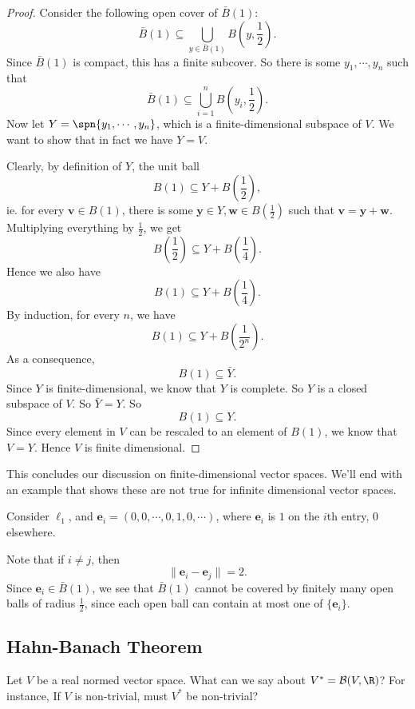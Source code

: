 \documentclass[a4paper]{article}
\begin{document}
\begin{proof}
  Consider the following open cover of $\bar{B}(1)$:
  \[
    \bar{B}(1) \subseteq \bigcup_{y\in \bar{B}(1)} B\left(y, \frac{1}{2}\right).
  \]
  Since $\bar{B}(1)$ is compact, this has a finite subcover. So there is some $y_1, \cdots, y_n$ such that
  \[
    \bar{B}(1) \subseteq \bigcup_{i = 1}^n B\left(y_i, \frac{1}{2}\right).
  \]
  Now let $Y = \spn\{y_1, \cdots, y_n\}$, which is a finite-dimensional subspace of $V$. We want to show that in fact we have $Y = V$.

  Clearly, by definition of $Y$, the unit ball
  \[
    B(1) \subseteq Y + B\left(\frac{1}{2}\right),
  \]
  ie. for every $\mathbf{v}\in B(1)$, there is some $\mathbf{y}\in Y, \mathbf{w} \in B(\frac{1}{2})$ such that $\mathbf{v} = \mathbf{y} + \mathbf{w}$. Multiplying everything by $\frac{1}{2}$, we get
  \[
    B\left(\frac{1}{2}\right) \subseteq Y + B\left(\frac{1}{4}\right).
  \]
  Hence we also have
  \[
    B(1) \subseteq Y + B\left(\frac{1}{4}\right).
  \]
  By induction, for every $n$, we have
  \[
    B(1) \subseteq Y + B\left(\frac{1}{2^n}\right).
  \]
  As a consequence,
  \[
    B(1) \subseteq \bar{Y}.
  \]
  Since $Y$ is finite-dimensional, we know that $Y$ is complete. So $Y$ is a closed subspace of $V$. So $\bar{Y} = Y$. So
  \[
    B(1) \subseteq Y.
  \]
  Since every element in $V$ can be rescaled to an element of $B(1)$, we know that $V = Y$. Hence $V$ is finite dimensional.
\end{proof}
This concludes our discussion on finite-dimensional vector spaces. We'll end with an example that shows these are not true for infinite dimensional vector spaces.
\begin{eg}
  Consider $\ell_1$, and $\mathbf{e}_i = (0, 0, \cdots, 0, 1, 0, \cdots)$, where $\mathbf{e}_i$ is $1$ on the $i$th entry, $0$ elsewhere.

  Note that if $i \not= j$, then
  \[
    \|\mathbf{e}_i - \mathbf{e}_j\| = 2.
  \]
  Since $\mathbf{e}_i \in \bar{B}(1)$, we see that $\bar{B}(1)$ cannot be covered by finitely many open balls of radius $\frac{1}{2}$, since each open ball can contain at most one of $\{\mathbf{e}_i\}$.
\end{eg}

\subsection{Hahn-Banach Theorem}
Let $V$ be a real normed vector space. What can we say about $V^* = \mathcal{B}(V, \R)$? For instance, If $V$ is non-trivial, must $V^*$ be non-trivial?
\end{document}

